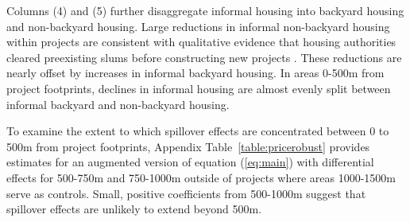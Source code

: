 \documentclass[12pt]{article}
\begin{document}

Columns (4) and (5) further disaggregate informal housing into backyard housing and non-backyard housing.  Large reductions in informal non-backyard housing within projects are consistent with qualitative evidence that housing authorities cleared preexisting slums before constructing new projects \citep{hofmeyr2008risk}.  These reductions are nearly offset by increases in informal backyard housing.  In areas 0-500m from project footprints, declines in informal housing are almost evenly split between informal backyard and non-backyard housing.

To examine the extent to which spillover effects are concentrated between 0 to 500m from project footprints, Appendix Table~\ref{table:pricerobust} provides estimates for an augmented version of equation (\ref{eq:main}) with differential effects for 500-750m and 750-1000m outside of projects where areas 1000-1500m serve as controls.  Small, positive coefficients from 500-1000m suggest that spillover effects are unlikely to extend beyond 500m.  




\end{document}
